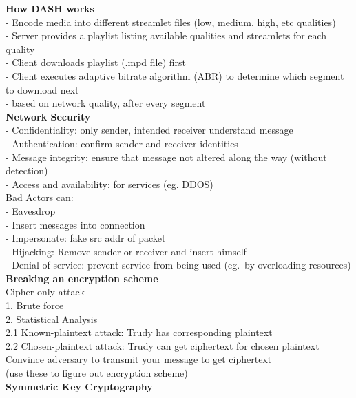 \documentclass[10pt, a4paper]{article}
\newcommand{\red}[1]{{\color{red}#1}}
\newcommand{\tab}[0]{\hspace*{2mm}}
\begin{document}
\begin{multicols*}{3}
		\textbf{How DASH works}\\
		- Encode media into different streamlet files (low, medium, high, etc qualities)\\
		- Server provides a playlist listing available qualities and streamlets for each quality\\
		- Client downloads playlist (.mpd file) first\\
		- Client executes adaptive bitrate algorithm (ABR) to determine which segment to download next\\
		\tab - based on network quality, after every segment\\

		{\normalsize\textbf{Network Security}}\\
		- \red{Confidentiality}: only sender, intended receiver understand message\\
		- \red{Authentication}: confirm sender and receiver identities\\
		- \red{Message integrity}: ensure that message not altered along the way (without detection)\\
		- \red{Access and availability}: for services (eg. DDOS)\\

		Bad Actors can:\\
		- Eavesdrop\\
		- Insert messages into connection\\
		- Impersonate: fake src addr of packet\\
		- Hijacking: Remove sender or receiver and insert himself\\
		- Denial of service: prevent service from being used (eg.\ by overloading resources)\\

		\textbf{Breaking an encryption scheme}\\
		Cipher-only attack\\
		1. Brute force\\
		2. Statistical Analysis\\
		\tab 2.1 Known-plaintext attack: Trudy has corresponding plaintext\\
		\tab 2.2 Chosen-plaintext attack: Trudy can get ciphertext for chosen plaintext\\
		\tab\tab\tab Convince adversary to transmit your message to get ciphertext\\
		\tab (use these to figure out encryption scheme)\\

		\textbf{Symmetric Key Cryptography}\\






















		

		
		
	\end{multicols*}
\end{document}
